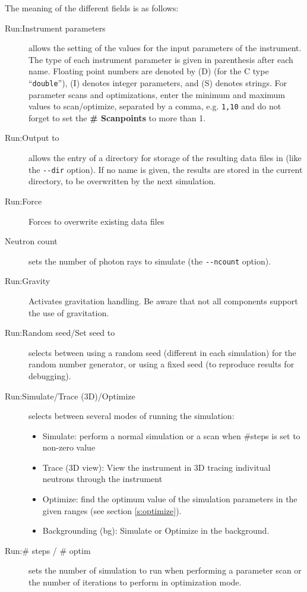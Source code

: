 The meaning of the different fields is as follows:
\begin{description}
\item[Run:Instrument parameters] allows the setting of the values for
  the input parameters of the instrument. The type of each instrument
  parameter is given in parenthesis after each name. Floating point
  numbers are denoted by (D) (for the C type ``\verb+double+''), (I)
  denotes integer parameters, and (S) denotes strings. For parameter scans and optimizations, enter the minimum and maximum values to scan/optimize, separated by a comma, e.g. \verb+1,10+ and do not forget to set the {\bfseries \# Scanpoints} to more than 1.
\item[Run:Output to] allows the entry of a directory for storage of the
  resulting data files in (like the \verb+--dir+ option). If no name is
  given, the results are stored in the current directory, to be overwritten
  by the next simulation.
\item[Run:Force] Forces to overwrite existing data files
\item[Neutron count] sets the number of photon rays to
  simulate (the \verb+--ncount+ option).
\item[Run:Gravity] Activates gravitation handling. Be aware that not all
    components support the use of gravitation.
\item[Run:Random seed/Set seed to] selects between using a random seed (different
  in each simulation) for the random number generator, or using a fixed
  seed (to reproduce results for debugging).
\item[Run:Simulate/Trace (3D)/Optimize] selects between several modes of
  running the simulation:
  \begin{itemize}
  \item Simulate: perform a normal simulation or a scan when \#steps
    is set to non-zero value
  \item Trace (3D view): View the instrument in 3D tracing indivitual
    neutrons through the instrument
  \item Optimize: find the optimum value of the simulation parameters
    in the given ranges (see section \ref{s:optimize}).
  \item Backgrounding (bg): Simulate or Optimize in the background.
\end{itemize}
\item[Run:\# steps / \# optim] sets the number of simulation to run when
  performing a parameter scan or the number of iterations to
  perform in optimization mode.

\end{description}

